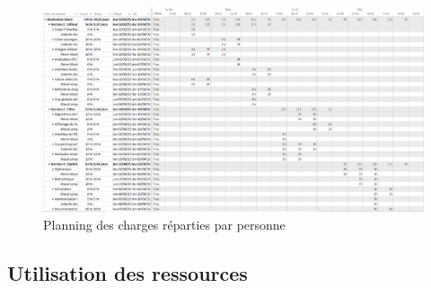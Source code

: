 		\begin{landscape}
		 	\begin{figure}
	            \centering
	            \includegraphics[height=0.70\textwidth]{figure/RepartitionTaches2.png}
	            \caption{Planning des charges réparties par personne}
	            \label{fig:planning_charge}
	        \end{figure}
	    \end{landscape}

	    \subsection{Utilisation des ressources}